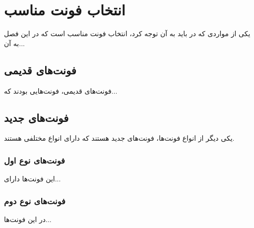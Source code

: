 \chapter{انتخاب فونت مناسب}
یکی از مواردی که در  باید به آن توجه کرد،
انتخاب فونت مناسب است که در این فصل به آن...
\section{فونت‌های قدیمی}
فونت‌های قدیمی، فونت‌هایی بودند که...
\section{فونت‌های جدید}
یکی دیگر از انواع فونت‌ها، فونت‌های جدید هستند که دارای
انواع مختلفی هستند.
\subsection{فونت‌های نوع اول}
این فونت‌ها دارای...
\subsection{فونت‌های نوع دوم}
در این فونت‌ها...